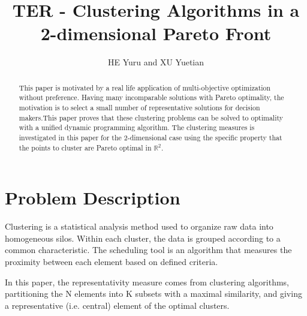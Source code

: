 \documentclass{meta}
\def\RR{{\mathbb{R}}}
\begin{document}
\pagestyle{headings}

\mainmatter

\title{TER - Clustering Algorithms in a 2-dimensional Pareto Front}


\author{ HE Yuru and XU Yuetian }



\maketitle

\begin{abstract}
This paper is motivated by a real life application of multi-objective optimization without preference.
Having many incomparable solutions with Pareto optimality, 
the motivation is to select a small number of representative solutions for decision makers.This paper proves that these clustering problems can be solved to optimality with a unified dynamic programming algorithm. 
The clustering measures is investigated in this paper for the $2$-dimensional case
using the specific property that the points to cluster are Pareto optimal in $\RR^2$.

\end{abstract}



\section{Problem Description}

Clustering is a statistical analysis method used to organize raw data into homogeneous silos. Within each cluster, the data is grouped according to a common characteristic. The scheduling tool is an algorithm that measures the proximity between each element based on defined criteria. 

In this paper, the representativity measure comes from clustering algorithms, partitioning the N elements into K subsets with a maximal similarity, and giving a representative (i.e. central) element of the optimal clusters.
\end{document}

